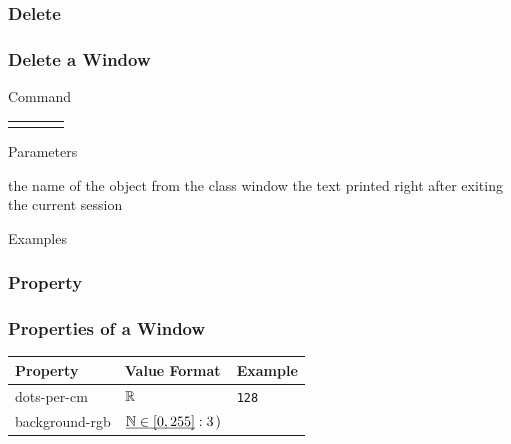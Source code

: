 \documentclass[9pt]{beamer}
\begin{document}
\subsubsection{Delete}

\begin{frame}[t] \frametitle{Delete a Window}

	\begin{block}{Command} 
		\begin{tabularx}{\textwidth}{@{}l@{}l@{}l@{}R}
			 &
				 &
			  	 & \InstrItem
		\end{tabularx}
	\end{block}

	\begin{block}{Parameters} \begin{itemize}
		   the name of the object from the class window
		    the text printed right after exiting the current session
	\end{itemize} \end{block}

	\begin{block}{Examples}
	\end{block}

\end{frame}

\subsubsection{Property}

\begin{frame}[t] \frametitle{Properties of a Window}

	\renewcommand\arraystretch{1.6}
	\begin{tabularx}{\textwidth}{|l|l|R|}
		\hline
		Property       & Value Format & Example \\ \hline
		\hline
		dots-per-cm    & $\MSR$ & \texttt{128} \\ \hline
		background-rgb & $\Tup{\Param{\MSN\in[0,255]}}{3}$ & \texttt{} \\ \hline
	\end{tabularx}

\end{frame}
\end{document}
